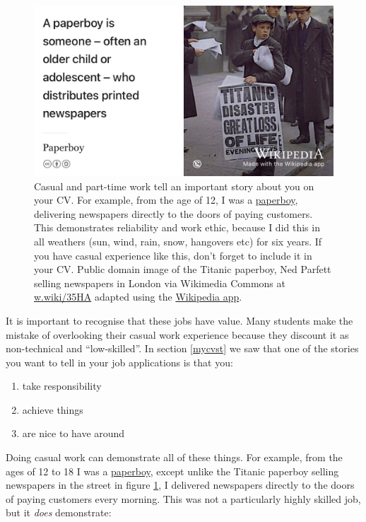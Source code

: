 \documentclass[
]{book}
\providecommand{\tightlist}{%
  \setlength{\itemsep}{0pt}\setlength{\parskip}{0pt}}
\begin{document}
\begin{figure}

{\centering \includegraphics[width=0.99\linewidth]{images/Titanic-paperboy-crop} 

}

\caption{Casual and part-time work tell an important story about you on your CV. For example, from the age of 12, I was a \href{https://en.wikipedia.org/wiki/Paperboy}{paperboy}, delivering newspapers directly to the doors of paying customers. This demonstrates reliability and work ethic, because I did this in all weathers (sun, wind, rain, snow, hangovers etc) for six years. If you have casual experience like this, don't forget to include it in your CV. Public domain image of the Titanic paperboy, Ned Parfett selling newspapers in London via Wikimedia Commons at \href{https://w.wiki/35HA}{w.wiki/35HA} adapted using the \href{https://apps.apple.com/us/app/wikipedia/id324715238}{Wikipedia app}.}\label{fig:paperboy-fig}
\end{figure}



It is important to recognise that these jobs have value. Many students make the mistake of overlooking their casual work experience because they discount it as non-technical and ``low-skilled''. In section \ref{mycvst} we saw that one of the stories you want to tell in your job applications is that you:

\begin{enumerate}
\def\labelenumi{\arabic{enumi}.}
\tightlist
\item
  take responsibility
\item
  achieve things
\item
  are nice to have around
\end{enumerate}

Doing casual work can demonstrate all of these things. For example, from the ages of 12 to 18 I was a \href{https://en.wikipedia.org/wiki/Paperboy}{paperboy}, except unlike the Titanic paperboy selling newspapers in the street in figure \ref{fig:paperboy-fig}, I delivered newspapers directly to the doors of paying customers every morning. This was not a particularly highly skilled job, but it \emph{does} demonstrate:
\end{document}

